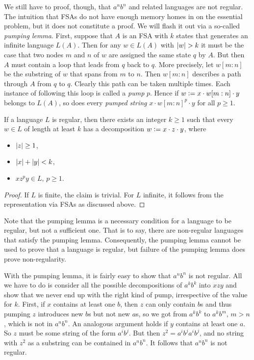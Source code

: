 We still have to proof, though, that $a^n b^n$ and related languages are not regular.
The intuition that FSAs do not have enough memory homes in on the essential problem, but it does not constitute a proof.
We will flash it out via a so-called \emph{pumping lemma}.
First, suppose that $A$ is an FSA with $k$ states that generates an infinite language $L(A)$.
Then for any $w \in L(A)$ with $| w | > k$ it must be the case that two nodes $m$ and $n$ of $w$ are assigned the same state $q$ by $A$.
But then $A$ must contain a loop that leads from $q$ back to $q$.
More precisely, let $w[m:n]$ be the substring of $w$ that spans from $m$ to $n$.
Then $w[m:n]$ describes a path through $A$ from $q$ to $q$.
Clearly this path can be taken multiple times.
Each instance of following this loop is called a \emph{pump} $p$.
Hence if $w \mathrel{\mathop:}= x \cdot w[m:n] \cdot y$ belongs to $L(A)$, so does every \emph{pumped string} $x \cdot w[m:n]^p \cdot y$ for all $p \geq 1$.
%
\begin{theorem}
    If a language $L$ is regular, then there exists an integer $k \geq 1$ such that every $w \in L$ of length at least $k$ has a decomposition $w \mathrel{\mathop:}= x \cdot z \cdot y$, where
    \begin{itemize}
        \item $| z | \geq 1$,
        \item $| x | + | y | < k$,
        \item $x z^p y \in L$, $p \geq 1$.
    \end{itemize}
\end{theorem}
%
\begin{proof}
    If $L$ is finite, the claim is trivial.
    For $L$ infinite, it follows from the representation via FSAs as discussed above.
\end{proof}
%
Note that the pumping lemma is a necessary condition for a language to be regular, but not a sufficient one.
That is to say, there are non-regular languages that satisfy the pumping lemma.
Consequently, the pumping lemma cannot be used to prove that a language is regular, but failure of the pumping lemma does prove non-regularity.

With the pumping lemma, it is fairly easy to show that $a^n b^n$ is not regular.
All we have to do is consider all the possible decompositions of $a^k b^k$ into $xzy$ and show that we never end up with the right kind of pump, irrespective of the value for $k$.
First, if $x$ contains at least one $b$, then $z$ can only contain $b$s and thus pumping $z$ introduces new $b$s but not new $a$s, so we got from $a^k b^k$ to $a^k b^m$, $m > n$, which is not in $a^n b^n$.
An analogous argument holds if $y$ contains at least one $a$.
So $z$ must be some string of the form $a^i b^j$.
But then $z^2 = a^i b^j a^i b^j$, and no string with $z^2$ as a substring can be contained in $a^n b^n$.
It follows that $a^n b^n$ is not regular.

